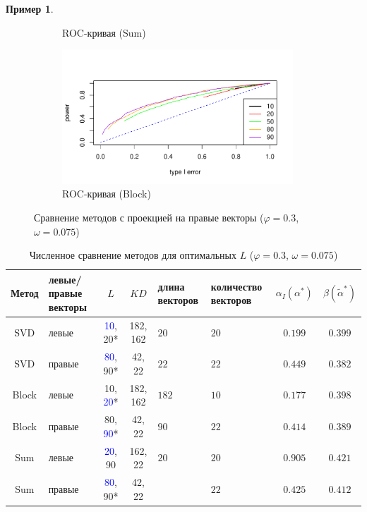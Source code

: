 \documentclass[specialist,
substylefile = spbu_report.rtx,
subf,href,colorlinks=true, 12pt]{disser}
\theoremstyle{definition}
\newtheorem{example}{Пример}
\begin{document}
\begin{example}
\begin{figure}[h!]
\begin{subfigure}[t]{0.5\textwidth}
			\caption{ROC-кривая (Sum)}
		\end{subfigure}\hspace{\fill}
		\begin{subfigure}[t]{0.5\textwidth}
			\centering
			\includegraphics[width=0.95\textwidth]{img/roc_block_fa_phi3_omega0075.pdf}
			\caption{ROC-кривая (Block)}
		\end{subfigure}
		\caption{Сравнение методов с проекцией на правые векторы ($\varphi=0.3$, $\omega=0.075$)}
		\label{fig:sum_block_fa_phi3}
	\end{figure}
	\begin{table}[h]
		\caption{Численное сравнение методов для оптимальных $L$ ($\varphi=0.3$, $\omega=0.075$)}
		\label{tab:res_mc-ssa_phi3}
		\centering
		\begin{tabular}{|c>{\centering\arraybackslash}m{1in}cc>{\centering\arraybackslash}m{1in} >{\centering\arraybackslash}m{1in}cc|}\hline
			Метод & левые/правые векторы & $L$ & $KD$ & длина векторов & количество векторов & $\alpha_I(\alpha^*)$ & $\beta(\widetilde{\alpha}^*)$ \\
			\hline
			SVD & левые & \textcolor{blue}{10}, 20* & 182, 162 & $20$ & $20$ & $0.199$ & $\mathbf{0.399}$ \\
			\hline
			SVD  & правые & \textcolor{blue}{80}, 90* & 42, 22  & $22$ & $22$ & $0.449$ & $0.382$ \\
			\hline
			Block & левые & 10, \textcolor{blue}{20}* & 182, 162 & $182$ & $10$ & $0.177$ & $\mathbf{0.398}$ \\
			\hline
			Block & правые & 80, \textcolor{blue}{90}* & 42, 22 & $90$ & $22$ & $0.414$ & $0.389$\\
			\hline
			Sum & левые & \textcolor{blue}{20}, 90 & 162, 22 & $20$ & $20$ & $0.905$ & $\mathbf{0.421}$ \\
			\hline
			Sum & правые & \textcolor{blue}{80}, 90* & 42, 22 & 22 & $22$ & $0.425$ & $\mathbf{0.412}$ \\
			\hline
		\end{tabular}
	

\end{table}
\end{example}
\end{document}
